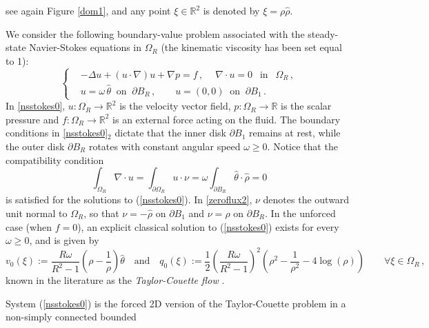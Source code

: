 \documentclass[a4paper,11pt]{article}
\numberwithin{equation}{section}
\numberwithin{figure}{section}
\newcommand{\R}{\mathbb{R}}
\def\eq#1{(\ref{#1})}
\begin{document}
see again Figure \ref{dom1}, and any point $\xi\in\R^2$ is denoted by $\xi = \rho\widehat{\rho}$.\par
We consider the following boundary-value problem associated with the steady-state Navier-Stokes equations in $\Omega_{R}$
(the kinematic viscosity has been set equal to 1):
\begin{equation}\label{nsstokes0}
\left\{
\begin{aligned}
& -\Delta u+(u\cdot\nabla)u+\nabla p=f \, ,\ \quad  \nabla\cdot u=0 \ \ \mbox{ in } \ \ \Omega_{R} \, , \\[3pt]
& u = \omega \, \widehat{\theta} \ \text{ on } \ \partial B_R \, , \qquad u = (0,0) \ \text{ on } \ \partial B_{1} \, .
\end{aligned}
\right.
\end{equation}
In \eqref{nsstokes0}, $u : \Omega_{R} \longrightarrow \mathbb{R}^2$ is the velocity vector field, $p : \Omega_{R} \longrightarrow \mathbb{R}$ is
the scalar pressure and $f : \Omega_{R} \longrightarrow \mathbb{R}^2$ is an external force acting on the fluid. The boundary conditions in
\eqref{nsstokes0}$_2$ dictate that the inner disk $\partial B_1$ remains at rest, while the outer disk $\partial B_R$ rotates with constant
angular speed $\omega \geq 0$. Notice that the compatibility condition
\begin{equation} \label{zeroflux2}
\int_{\Omega_R}\nabla \cdot u =\int_{\partial\Omega_R}u \cdot \nu = \omega\int_{\partial B_R} \widehat{\theta} \cdot \widehat{\rho} = 0
\end{equation}
is satisfied for the solutions to \eq{nsstokes0}. In  \eqref{zeroflux2}, $\nu$ denotes the outward unit normal to $\Omega_R$, so that
$\nu=-\widehat{\rho}$
on $\partial B_1$ and $\nu=\widehat{\rho}$ on $\partial B_R$. In the unforced case (when $f = 0$), an explicit classical solution to
\eq{nsstokes0} exists for every $\omega \geq 0$, and is given by
\begin{equation} \label{tc1}
v_{0}(\xi) := \dfrac{R \omega}{R^2 - 1} \left( \rho - \dfrac{1}{\rho} \right) \widehat{\theta} \quad \text{and} \quad q_{0}(\xi) :=
\dfrac{1}{2} \left( \dfrac{R \omega}{R^2 - 1} \right)^{2} \left( \rho^{2} - \dfrac{1}{\rho^{2}} - 4 \log(\rho) \right) \qquad \forall \xi \in
\Omega_{R} \, ,
\end{equation}
known in the literature as the \textit{Taylor-Couette flow} \cite[Chapter II]{landau}.\par
System \eq{nsstokes0} is the forced 2D version of the Taylor-Couette problem in a non-simply connected bounded
\end{document}
